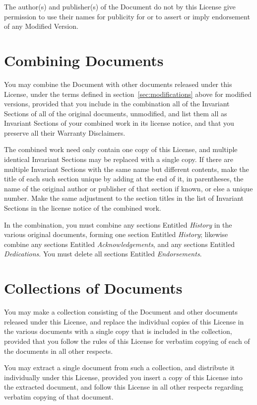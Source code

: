 The author(s) and publisher(s) of the Document do not by this License
give permission to use their names for publicity for or to assert or
imply endorsement of any Modified Version.


\section{Combining Documents}

You may combine the Document with other documents released under this
License, under the terms defined in section~\ref{sec:modifications}
above for modified versions, provided that you include in the
combination all of the Invariant Sections of all of the original
documents, unmodified, and list them all as Invariant Sections of your
combined work in its license notice, and that you preserve all their
Warranty Disclaimers.

The combined work need only contain one copy of this License, and
multiple identical Invariant Sections may be replaced with a single
copy.  If there are multiple Invariant Sections with the same name but
different contents, make the title of each such section unique by
adding at the end of it, in parentheses, the name of the original
author or publisher of that section if known, or else a unique number.
Make the same adjustment to the section titles in the list of
Invariant Sections in the license notice of the combined work.

In the combination, you must combine any sections Entitled
\emph{History} in the various original documents, forming one section
Entitled \emph{History}; likewise combine any sections Entitled
\emph{Acknowledgements}, and any sections Entitled \emph{Dedications}.
You must delete all sections Entitled \emph{Endorsements}.


\section{Collections of Documents}

You may make a collection consisting of the Document and other
documents released under this License, and replace the individual
copies of this License in the various documents with a single copy
that is included in the collection, provided that you follow the rules
of this License for verbatim copying of each of the documents in all
other respects.

You may extract a single document from such a collection, and
distribute it individually under this License, provided you insert a
copy of this License into the extracted document, and follow this
License in all other respects regarding verbatim copying of that
document.


